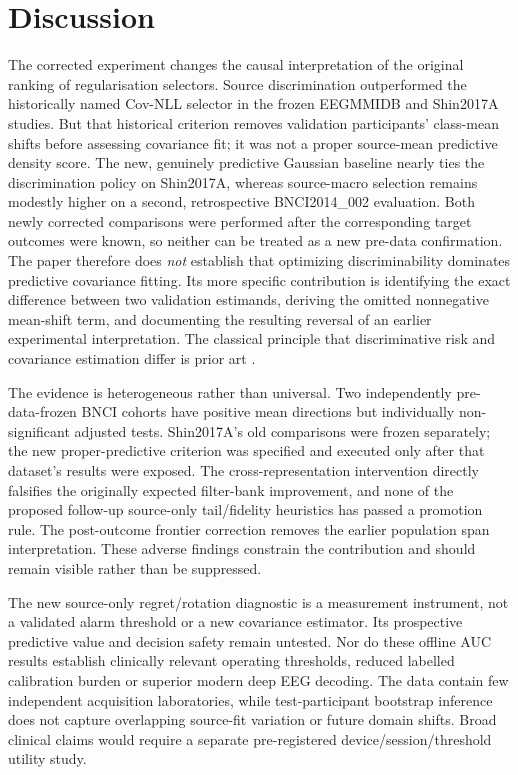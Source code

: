 \documentclass[11pt,a4paper]{article}
\begin{document}
\section{Discussion}
The corrected experiment changes the causal interpretation of the
original ranking of regularisation selectors. Source discrimination
outperformed the historically named Cov-NLL selector in the frozen
EEGMMIDB and Shin2017A studies. But that historical criterion removes
validation participants' class-mean shifts before assessing covariance
fit; it was not a proper source-mean predictive density score.
The new, genuinely predictive Gaussian baseline nearly ties
the discrimination policy on Shin2017A, whereas source-macro
selection remains modestly higher on a second, retrospective
BNCI2014\_002 evaluation. Both newly corrected comparisons
were performed after the corresponding target outcomes
were known, so neither can be treated as a new pre-data
confirmation. The paper therefore does
\emph{not} establish that optimizing discriminability dominates
predictive covariance fitting. Its more specific contribution is
identifying the exact difference between two validation estimands,
deriving the omitted nonnegative mean-shift term, and documenting
the resulting reversal of an earlier experimental interpretation.
The classical principle that discriminative risk and covariance
estimation differ is prior art \cite{friedman1989,tomioka2010regularized}.

The evidence is heterogeneous rather than universal. Two independently
pre-data-frozen BNCI cohorts have positive mean directions but individually
non-significant adjusted tests. Shin2017A's old comparisons were frozen
separately; the new proper-predictive criterion was specified and executed
only after that dataset's results were exposed.
The cross-representation intervention directly falsifies the originally
expected filter-bank improvement, and none of the proposed follow-up
source-only tail/fidelity heuristics has passed a promotion rule.
The post-outcome frontier correction removes the earlier population
span interpretation. These adverse findings constrain the contribution
and should remain visible rather than be suppressed.

The new source-only regret/rotation diagnostic is a measurement instrument,
not a validated alarm threshold or a new covariance estimator. Its
prospective predictive value and decision safety remain untested. Nor do
these offline AUC results establish clinically relevant operating thresholds,
reduced labelled calibration burden or superior modern deep EEG decoding.
The data contain few independent acquisition laboratories, while
test-participant bootstrap inference does not capture overlapping
source-fit variation or future domain shifts. Broad clinical claims
would require a separate pre-registered device/session/threshold utility study.
\end{document}
